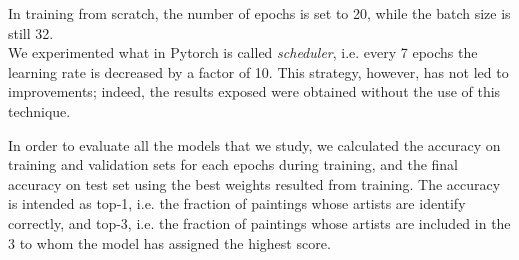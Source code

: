 \documentclass{article}
\begin{document}
In training from scratch, the number of epochs is set to 20, while the batch size is still 32.\\ 
We experimented what in Pytorch is called \textit{scheduler}, i.e. every 7 epochs the learning rate is decreased by a factor of 10. This strategy, however, has not led to improvements; indeed, the results exposed were obtained without the use of this technique.

In order to evaluate all the models that we study, we calculated the accuracy on training and validation sets for each epochs during training, and the final accuracy on test set using the best weights resulted from training. The accuracy is intended as top-1, i.e.  the fraction of paintings whose artists are identify correctly, and top-3, i.e. the fraction of paintings whose artists are included in the 3 to whom the model has assigned the highest score.
\end{document}
